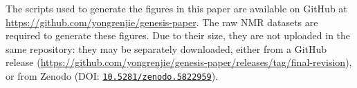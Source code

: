 \documentclass[a4paper,11pt]{article}
\begin{document}
\begin{refsection}
The scripts used to generate the figures in this paper are available on GitHub at \url{https://github.com/yongrenjie/genesis-paper}.
The raw NMR datasets are required to generate these figures.
Due to their size, they are not uploaded in the same repository: they may be separately downloaded, either from a GitHub release (\url{https://github.com/yongrenjie/genesis-paper/releases/tag/final-revision}), or from Zenodo (DOI: \href{https://doi.org/10.5281/zenodo.5822959}{\texttt{10.5281/zenodo.5822959}}).

\AtNextBibliography{\small}
\printbibliography{}
\clearpage    %

\end{refsection}
\end{document}
